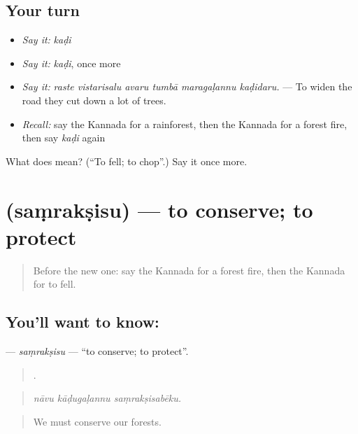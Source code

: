 \subsection*{Your turn}
\begin{itemize}
\raggedright
  \item \emph{Say it:} \emph{kaḍi}
  \item \emph{Say it:} \emph{kaḍi}, once more
  \item \emph{Say it:} \emph{raste vistarisalu avaru tumbā maragaḷannu kaḍidaru.} — To widen the road they cut down a lot of trees.
  \item \emph{Recall:} say the Kannada for a rainforest, then the Kannada for a forest fire, then say \emph{kaḍi} again
\end{itemize}

\begin{tcolorbox}[breakable,colback=teal!4,colframe=teal!35!black,title={Before you move on}]
What does  mean? (\textquotedblleft{}To fell; to chop\textquotedblright{}.) Say it once more.
\end{tcolorbox}
\section[\texorpdfstring{\kn{ಸಂರಕ್ಷಿಸು} (saṃrakṣisu)}{ಸಂರಕ್ಷಿಸು (saṃrakṣisu)}]{ (saṃrakṣisu) — to conserve; to protect}

\label{lesson:KA-C475-samraksisu}



\begin{quote}
Before the new one: say the Kannada for a forest fire, then the Kannada for to fell.
\end{quote}

\subsection*{You'll want to know: }
\textbf{} — \emph{saṃrakṣisu} — \textquotedblleft{}to conserve; to protect\textquotedblright{}.

\begin{quote}
  .
\end{quote}

\begin{quote}
\emph{nāvu kāḍugaḷannu saṃrakṣisabēku.}
\end{quote}

\begin{quote}
We must conserve our forests.
\end{quote}

